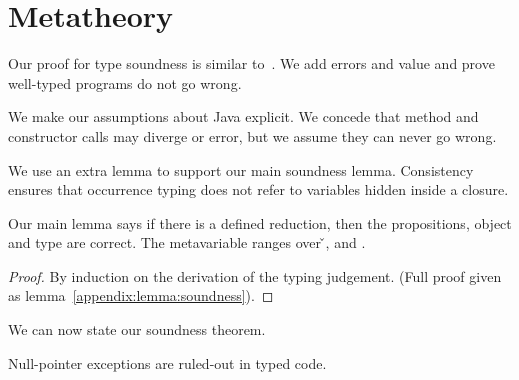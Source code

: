 \section{Metatheory}
\label{sec:metatheory}

Our proof for type soundness is similar to~\citet{TF10}. We add
errors and \wrong{} value and prove
well-typed programs do not go wrong.

We make our assumptions about Java explicit. We concede that
method and constructor calls may diverge or error, but we assume they can
never go wrong.

{}



We use an extra lemma to support our main soundness lemma. Consistency
ensures that occurrence typing does not refer to variables
hidden inside a closure.

{}

Our main lemma says if there is a defined reduction, then the propositions, object
and type are correct.
The metavariable  ranges over \v{}, \errorvalv{} and \wrong{}.

\begin{lemma}\label{main:lemma:soundness}

  {\soundnesslemmahypothesis}
  \begin{proof}
    By induction on the derivation of the typing judgement. 
    (Full proof given as lemma~\ref{appendix:lemma:soundness}).
  \end{proof}
\end{lemma}


We can now state our soundness theorem.

{}

{}

Null-pointer exceptions are ruled-out in typed code.

{}
